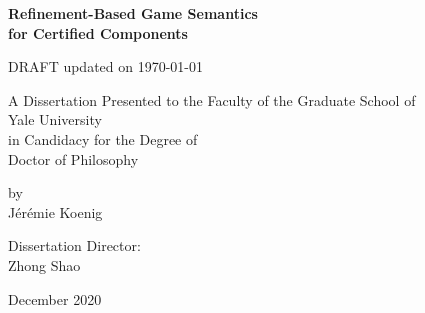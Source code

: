 \documentclass[11pt,oneside,draft]{book}
\theoremstyle{definition}
\begin{document}






\begin{titlepage} %
  \large
  \centering

  \vspace*{0in}
  {\Huge \bf Refinement-Based Game Semantics \\[0.5ex] for Certified Components}

  DRAFT updated on \today

  \vfill
  A Dissertation
  Presented to the Faculty of the Graduate School
  of \\
  {\Large Yale University} \\
  in Candidacy for the Degree of \\
  {\Large Doctor of Philosophy}

  \vfill
  by \\
  {\Large J\'er\'emie Koenig}

  \vspace{2em}
  Dissertation Director: \\
  {\Large Zhong Shao}

  \vspace{2em}
  December 2020
  \vspace{2em}
\end{titlepage}
\end{document}
